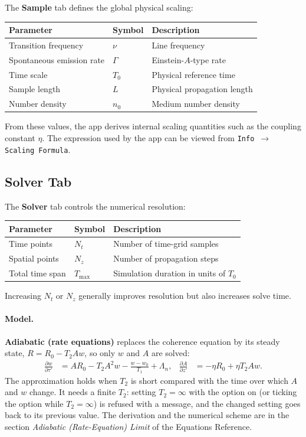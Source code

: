 \documentclass[12pt,a4paper]{article}
\newcommand{\tab}[1]{\textbf{#1}}
\newcommand{\menu}[1]{\texttt{#1}}
\begin{document}
The \tab{Sample} tab defines the global physical scaling:
\begin{center}
\begin{tabular}{@{}lll@{}}
  \toprule
  Parameter & Symbol & Description \\
  \midrule
  Transition frequency & $\nu$ & Line frequency \\
  Spontaneous emission rate & $\Gamma$ & Einstein-$A$-type rate \\
  Time scale & $T_0$ & Physical reference time \\
  Sample length & $L$ & Physical propagation length \\
  Number density & $n_0$ & Medium number density \\
  \bottomrule
\end{tabular}
\end{center}

From these values, the app derives internal scaling quantities such as the coupling constant $\eta$.
The expression used by the app can be viewed from \menu{Info $\to$ Scaling Formula}.

\subsection{Solver Tab}

The \tab{Solver} tab controls the numerical resolution:
\begin{center}
\begin{tabular}{@{}lll@{}}
  \toprule
  Parameter & Symbol & Description \\
  \midrule
  Time points & $N_t$ & Number of time-grid samples \\
  Spatial points & $N_z$ & Number of propagation steps \\
  Total time span & $T_{\max}$ & Simulation duration in units of $T_0$ \\
  \bottomrule
\end{tabular}
\end{center}

Increasing $N_t$ or $N_z$ generally improves resolution but also increases solve time.

\paragraph{Model.} \textbf{Adiabatic (rate equations)} replaces the coherence equation by its
steady state, $R = R_0 - T_2 A w$, so only $w$ and $A$ are solved:
\begin{align*}
  \frac{\partial w}{\partial \tau'} &= A R_0 - T_2 A^2 w - \frac{w - w_0}{T_1} + \Lambda_n, &
  \frac{\partial A}{\partial z'} &= -\eta R_0 + \eta T_2 A w .
\end{align*}
The approximation holds when $T_2$ is short compared with the time over which $A$ and $w$ change.
It needs a finite $T_2$: setting $T_2 = \infty$ with the option on (or ticking the option while
$T_2 = \infty$) is refused with a message, and the changed setting goes back to its previous value.
The derivation and the numerical scheme are in the section \emph{Adiabatic (Rate-Equation) Limit}
of the Equations Reference.
\end{document}
